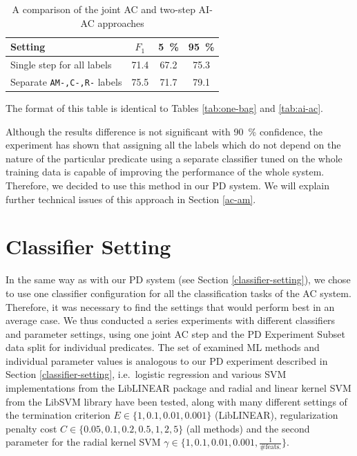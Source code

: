 \documentclass[12pt,notitlepage,a4paper]{report}
\begin{document}
\begin{table}[htb]\label{tab:separate-ams}
\caption{A comparison of the joint AC and two-step AI-AC approaches}\footnotesize
\begin{center}
\begin{tabular}{|l|c|c|c|}\hline
\bf Setting & $F_1$ & \bf 5~\% & \bf 95~\% \\\hline
Single step for all labels & 71.4 & 67.2 & 75.3 \\
Separate \texttt{AM-,C-,R-} labels & 75.5 & 71.7 & 79.1 \\\hline
\end{tabular}
\end{center}
The format of this table is identical to Tables \ref{tab:one-bag} and \ref{tab:ai-ac}.
\end{table}

Although the results difference is not significant with 90~\% confidence, the experiment has shown that assigning all the labels which do not depend on the nature of the particular predicate using a separate classifier tuned on the whole training data is capable of improving the performance of the whole system. Therefore, we decided to use this method in our PD system. We will explain further technical issues of this approach in Section \ref{ac-am}.

\section{Classifier Setting}\label{ac-setting}

In the same way as with our PD system (see Section \ref{classifier-setting}), we chose to use one classifier configuration for all the classification tasks of the AC system. Therefore, it was necessary to find the settings that would perform best in an average case. We thus conducted a series experiments with different classifiers and parameter settings, using one joint AC step and the PD Experiment Subset data split for individual predicates. The set of examined ML methods and individual parameter values is analogous to our PD experiment described in Section \ref{classifier-setting}, i.e.\ logistic regression and various SVM implementations from the LibLINEAR package and radial and linear kernel SVM from the LibSVM library have been tested, along with many different settings of the termination criterion $E\in\{1,0.1,0.01,0.001\}$ (LibLINEAR), regularization penalty cost $C\in\{0.05,0.1,0.2,0.5,1,2,5\}$ (all methods) and the second parameter for the radial kernel SVM $\gamma\in\{1,0.1,0.01,0.001,\frac{1}{\mbox{\# feats.}}\}$.
\end{document}
